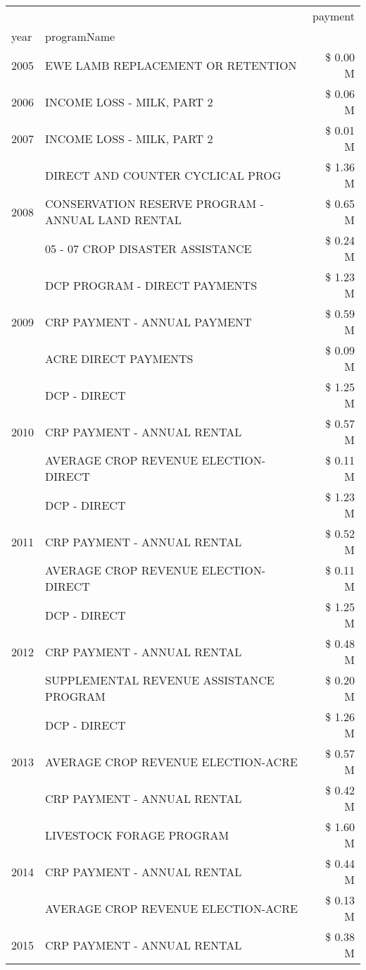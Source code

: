 \begin{tabular}{llr}
\toprule
 &  & payment \\
year & programName &  \\
\midrule
2005 & EWE LAMB REPLACEMENT OR RETENTION & \$ 0.00 M \\
\cline{1-3}
2006 & INCOME LOSS - MILK, PART 2 & \$ 0.06 M \\
\cline{1-3}
2007 & INCOME LOSS - MILK, PART 2 & \$ 0.01 M \\
\cline{1-3}
\multirow[t]{3}{*}{2008} & DIRECT AND COUNTER CYCLICAL PROG & \$ 1.36 M \\
 & CONSERVATION RESERVE PROGRAM - ANNUAL LAND RENTAL & \$ 0.65 M \\
 & 05 - 07 CROP DISASTER ASSISTANCE & \$ 0.24 M \\
\cline{1-3}
\multirow[t]{3}{*}{2009} & DCP PROGRAM - DIRECT PAYMENTS & \$ 1.23 M \\
 & CRP PAYMENT - ANNUAL PAYMENT & \$ 0.59 M \\
 & ACRE DIRECT PAYMENTS & \$ 0.09 M \\
\cline{1-3}
\multirow[t]{3}{*}{2010} & DCP - DIRECT & \$ 1.25 M \\
 & CRP PAYMENT - ANNUAL RENTAL & \$ 0.57 M \\
 & AVERAGE CROP REVENUE ELECTION-DIRECT & \$ 0.11 M \\
\cline{1-3}
\multirow[t]{3}{*}{2011} & DCP - DIRECT & \$ 1.23 M \\
 & CRP PAYMENT - ANNUAL RENTAL & \$ 0.52 M \\
 & AVERAGE CROP REVENUE ELECTION-DIRECT & \$ 0.11 M \\
\cline{1-3}
\multirow[t]{3}{*}{2012} & DCP - DIRECT & \$ 1.25 M \\
 & CRP PAYMENT - ANNUAL RENTAL & \$ 0.48 M \\
 & SUPPLEMENTAL REVENUE ASSISTANCE PROGRAM & \$ 0.20 M \\
\cline{1-3}
\multirow[t]{3}{*}{2013} & DCP - DIRECT & \$ 1.26 M \\
 & AVERAGE CROP REVENUE ELECTION-ACRE & \$ 0.57 M \\
 & CRP PAYMENT - ANNUAL RENTAL & \$ 0.42 M \\
\cline{1-3}
\multirow[t]{3}{*}{2014} & LIVESTOCK FORAGE PROGRAM & \$ 1.60 M \\
 & CRP PAYMENT - ANNUAL RENTAL & \$ 0.44 M \\
 & AVERAGE CROP REVENUE ELECTION-ACRE & \$ 0.13 M \\
\cline{1-3}
\multirow[t]{3}{*}{2015} & CRP PAYMENT - ANNUAL RENTAL & \$ 0.38 M \\

\end{tabular}

